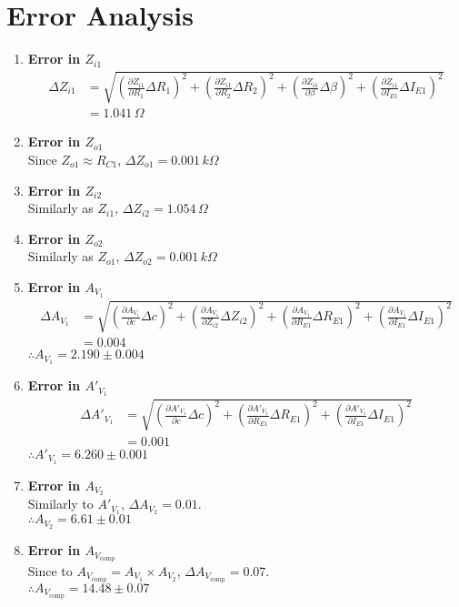 \section{Error Analysis}

\begin{enumerate}
    \item \textbf{Error in $Z_{i1}$}
        \begin{align*}
            \scriptstyle \Delta Z_{i1} &= \scriptstyle \sqrt{\left( \frac{\partial Z_{i1}}{\partial R_1} \Delta R_1 \right)^2 + \left( \frac{\partial Z_{i1}}{\partial R_2} \Delta R_2 \right)^2 + \left( \frac{\partial Z_{i1}}{\partial\beta} \Delta\beta \right)^2 + \left( \frac{\partial Z_{i1}}{\partial I_{E1}} \Delta I_{E1} \right)^2} \\
             &= 1.041\,\Omega
        \end{align*}
    \item \textbf{Error in $Z_{o1}$}\\
        Since $Z_{o1} \approx R_{C1}$, $\Delta Z_{o1} = 0.001\,k\Omega$
    \item \textbf{Error in $Z_{i2}$}\\
        Similarly as $Z_{i1}$, $\Delta Z_{i2} = 1.054\,\Omega$
    \item \textbf{Error in $Z_{o2}$}\\
        Similarly as $Z_{o1}$, $\Delta Z_{o2} = 0.001\,k\Omega$
    \item \textbf{Error in $A_{V_1}$}
        \begin{align*}
            \scriptstyle\Delta A_{V_1} &= \scriptstyle \sqrt{\left( \frac{\partial A_{V_1}}{\partial c} \Delta c \right)^2 + \left( \frac{\partial A_{V_1}}{\partial Z_{i2}} \Delta Z_{i2} \right)^2 + \left( \frac{\partial A_{V_1}}{\partial R_{E1}} \Delta R_{E1} \right)^2 + \left( \frac{\partial A_{V_1}}{\partial I_{E1}} \Delta I_{E1} \right)^2} \\
            &= 0.004
        \end{align*}
        $\therefore A_{V_1} = 2.190 \pm 0.004$
    \item \textbf{Error in $A'_{V_1}$}
        \begin{align*}
            \scriptstyle\Delta A'_{V_1} &= \scriptstyle \sqrt{\left( \frac{\partial A'_{V_1}}{\partial c} \Delta c \right)^2 + \left( \frac{\partial A'_{V_1}}{\partial R_{E1}} \Delta R_{E1} \right)^2 + \left( \frac{\partial A'_{V_1}}{\partial I_{E1}} \Delta I_{E1} \right)^2} \\
            &= 0.001
        \end{align*}
        $\therefore A'_{V_1} = 6.260 \pm 0.001$
    \item \textbf{Error in $A_{V_2}$}\\
        Similarly to $A'_{V_1}$, $\Delta A_{V_2} = 0.01$.\\
        $\therefore A_{V_2} = 6.61 \pm 0.01$
    \item \textbf{Error in $A_{V_\text{comp}}$}\\
        Since to $A_{V_\text{comp}} = A_{V_1} \times A_{V_2}$, $\Delta A_{V_\text{comp}} = 0.07$.\\
        $\therefore A_{V_\text{comp}} = 14.48 \pm 0.07$

\end{enumerate}